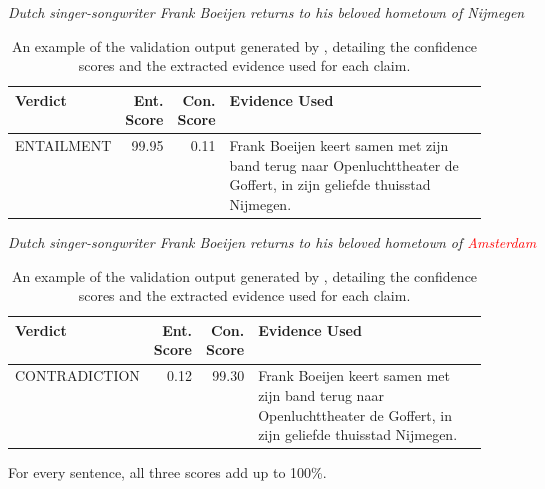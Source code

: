 \begin{table}[htbp]
    \centering
\caption{An example of the validation output generated by \rob, detailing the confidence scores and the extracted evidence used for each claim.}
    \label{tab:validation}
    \renewcommand{\arraystretch}{1.3}

    \vspace{0.2cm}
    \begin{flushleft}
         \textit{Dutch singer-songwriter Frank Boeijen returns to his beloved hometown of Nijmegen}
    \end{flushleft}
    \vspace{-0.3cm} %
    \begin{tabular}{l r r p{0.55\linewidth}}
        \toprule
        \textbf{Verdict} & \textbf{Ent. Score} & \textbf{Con. Score} & \textbf{Evidence Used} \\
        \midrule
        ENTAILMENT & 99.95 & 0.11 & Frank Boeijen keert samen met zijn band terug naar Openluchttheater de Goffert, in zijn geliefde thuisstad Nijmegen. \\
        \bottomrule
    \end{tabular}

    \vspace{0.4cm} %

    \begin{flushleft}
        \textit{Dutch singer-songwriter Frank Boeijen returns to his beloved hometown of \textcolor{red}{Amsterdam}}
    \end{flushleft}
    \vspace{-0.3cm}
    \begin{tabular}{l r r p{0.55\linewidth}}
        \toprule
        \textbf{Verdict} & \textbf{Ent. Score} & \textbf{Con. Score} & \textbf{Evidence Used} \\
        \midrule
        CONTRADICTION & 0.12 & 99.30 & Frank Boeijen keert samen met zijn band terug naar Openluchttheater de Goffert, in zijn geliefde thuisstad Nijmegen. \\
        \bottomrule
    \end{tabular}
\end{table}
\noindent For every sentence, all three scores add up to 100\%. 

